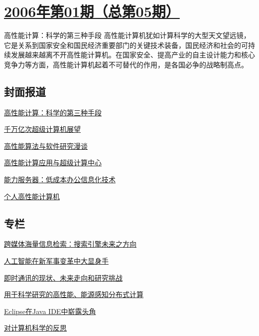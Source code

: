 \documentclass[a4paper]{article}
\begin{document}
\section{\href{http://history.ccf.org.cn/sites/ccf/jsjtbbd.jsp?contentId=2542567628932}{\textbf{2006年第01期（总第05期）}}}
高性能计算：科学的第三种手段 高性能计算机犹如计算科学的大型天文望远镜，它是关系到国家安全和国民经济重要部门的关键技术装备，国民经济和社会的可持续发展越来越离不开高性能计算机。在国家安全、提高产业的自主设计能力和核心竞争力等方面，高性能计算机起着不可替代的作用，是各国必争的战略制高点。
\subsection{封面报道}
\href{http://history.ccf.org.cn/resources/1190201776262/2010/04/15/005020.pdf}{高性能计算：科学的第三种手段}

\href{http://history.ccf.org.cn/resources/1190201776262/2010/04/15/005022.pdf}{千万亿次超级计算机展望}

\href{http://history.ccf.org.cn/resources/1190201776262/2010/04/15/005027.pdf}{高性能算法与软件研究漫谈}

\href{http://history.ccf.org.cn/resources/1190201776262/2010/04/15/005035.pdf}{高性能计算应用与超级计算中心}

\href{http://history.ccf.org.cn/resources/1190201776262/2010/04/15/005041.pdf}{能力服务器：低成本办公信息化技术}

\href{http://history.ccf.org.cn/resources/1190201776262/2010/04/15/005050.pdf}{个人高性能计算机}

\subsection{专栏}
\href{http://history.ccf.org.cn/resources/1190201776262/2010/04/15/005054.pdf}{跨媒体海量信息检索：搜索引擎未来之方向}

\href{http://history.ccf.org.cn/resources/1190201776262/2010/04/15/005058.pdf}{人工智能在新军事变革中大显身手}

\href{http://history.ccf.org.cn/resources/1190201776262/2010/04/15/005063.pdf}{即时通讯的现状、未来走向和研究挑战}

\href{http://history.ccf.org.cn/resources/1190201776262/2010/04/15/005067.pdf}{用于科学研究的高性能、能源感知分布式计算}

\href{http://history.ccf.org.cn/resources/1190201776262/2010/04/15/005074.pdf}{Eclipse在Java IDE中崭露头角}

\href{http://history.ccf.org.cn/resources/1190201776262/2010/04/15/005078.pdf}{对计算机科学的反思}
\end{document}
